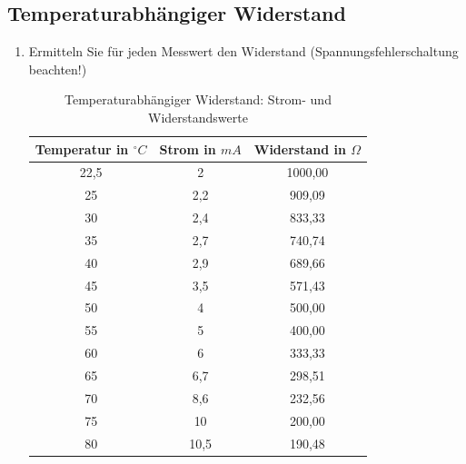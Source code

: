 \pagebreak
\subsection{Temperaturabhängiger Widerstand}
\begin{enumerate}[label=\alph*)]
	\item Ermitteln Sie für jeden Messwert den Widerstand (Spannungsfehlerschaltung beachten!)
	      \begin{table}[h!]
		      \caption{Temperaturabhängiger Widerstand: Strom- und Widerstandswerte}
		      \begin{center}
			      \begin{tabular}[c]{c|c|c}
				      \hline
				      \multicolumn{1}{c|}{\textbf{Temperatur in $^\circ C$}} &
				      \multicolumn{1}{c|}{\textbf{Strom in $mA$}}            &
				      \multicolumn{1}{c}{\textbf{Widerstand in $\Omega$}}                     \\
				      \hline
				      22,5                                                   & 2    & 1000,00 \\
				      25                                                     & 2,2  & 909,09  \\
				      30                                                     & 2,4  & 833,33  \\
				      35                                                     & 2,7  & 740,74  \\
				      40                                                     & 2,9  & 689,66  \\
				      45                                                     & 3,5  & 571,43  \\
				      50                                                     & 4    & 500,00  \\
				      55                                                     & 5    & 400,00  \\
				      60                                                     & 6    & 333,33  \\
				      65                                                     & 6,7  & 298,51  \\
				      70                                                     & 8,6  & 232,56  \\
				      75                                                     & 10   & 200,00  \\
				      80                                                     & 10,5 & 190,48  \\

\end{tabular}
\end{center}
\end{table}
\end{enumerate}
